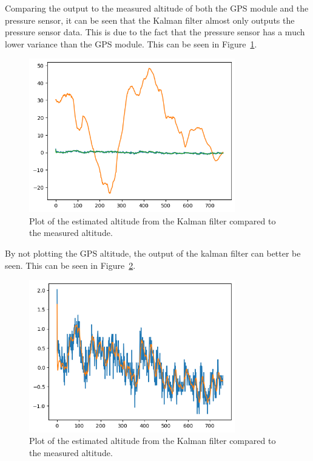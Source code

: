 Comparing the output to the measured altitude of both the GPS module and the pressure sensor, it can be seen that the Kalman filter almost only outputs the pressure sensor data.
This is due to the fact that the pressure sensor has a much lower variance than the GPS module.
This can be seen in Figure~\ref{fig:kalman-filter-test-compare}.
\begin{figure}[H]
    \centering
    \includegraphics[width=0.8\textwidth]{chapters/05Results/figures/filtere_pres_gpsalt}
    \caption{Plot of the estimated altitude from the Kalman filter compared to the measured altitude.}
    \label{fig:kalman-filter-test-compare}
\end{figure}

By not plotting the GPS altitude, the output of the kalman filter can better be seen.
This can be seen in Figure~\ref{fig:kalman-filter-test-compare-no-gps}.
\begin{figure}[H]
    \centering
    \includegraphics[width=0.8\textwidth]{chapters/05Results/figures/filtered_state_bar_alt}
    \caption{Plot of the estimated altitude from the Kalman filter compared to the measured altitude.}
    \label{fig:kalman-filter-test-compare-no-gps}
\end{figure}




